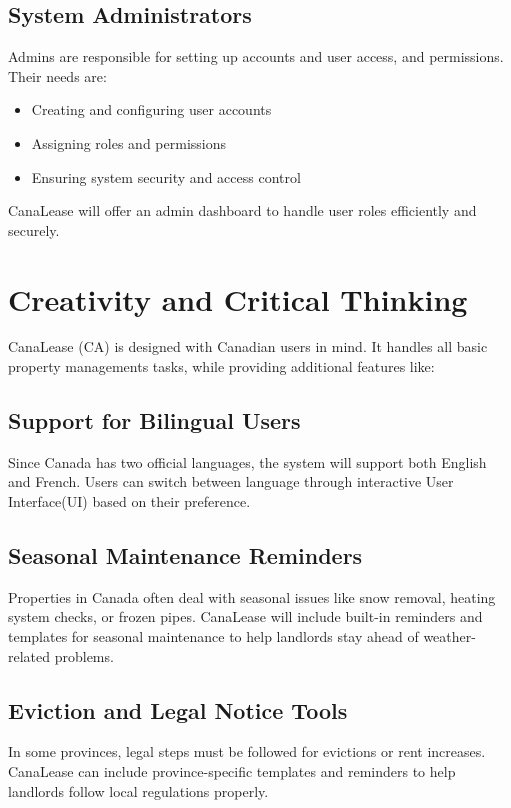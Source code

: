 \documentclass[12pt]{article}
\begin{document}
\subsection{System Administrators}
Admins are responsible for setting up accounts and user access, and permissions. Their needs are:
\begin{itemize}
    \item Creating and configuring user accounts
    \item Assigning roles and permissions
    \item Ensuring system security and access control
\end{itemize}
CanaLease will offer an admin dashboard to handle user roles efficiently and securely.


\section{Creativity and Critical Thinking}

CanaLease (CA) is designed with Canadian users in mind. It handles all basic property managements tasks, while providing additional features like: 

\subsection{Support for Bilingual Users}
Since Canada has two official languages, the system will support both English and French. Users can switch between language through interactive User Interface(UI) based on their preference.

\subsection{Seasonal Maintenance Reminders}
Properties in Canada often deal with seasonal issues like snow removal, heating system checks, or frozen pipes. CanaLease will include built-in reminders and templates for seasonal maintenance to help landlords stay ahead of weather-related problems.

\subsection{Eviction and Legal Notice Tools}
In some provinces, legal steps must be followed for evictions or rent increases. CanaLease can include province-specific templates and reminders to help landlords follow local regulations properly.
\end{document}
